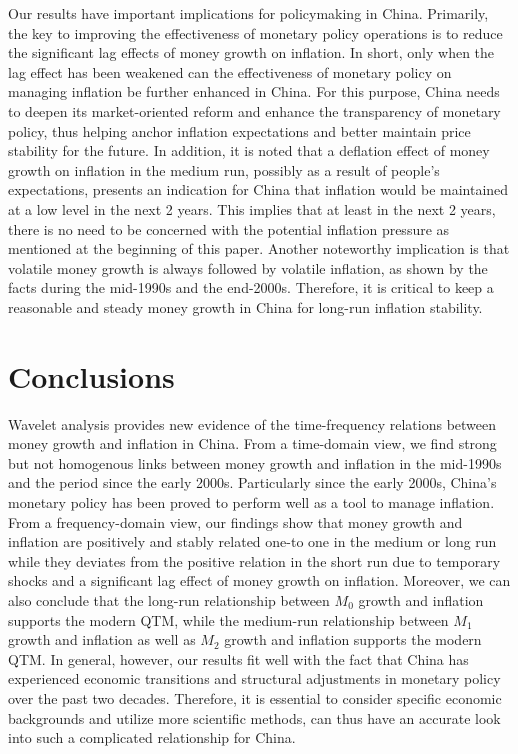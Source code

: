 \documentclass[a4paper,fleqn]{cas-sc}
\begin{document}
Our results have important implications for policymaking in China. Primarily, the key to improving the effectiveness of monetary policy operations is to reduce the significant lag effects of money growth on inflation. In short, only when the lag effect has been weakened can the effectiveness of monetary policy on managing inflation be further enhanced in China. For this purpose, China needs to deepen its market-oriented reform and enhance the transparency of monetary policy, thus helping anchor inflation expectations and better maintain price stability for the future. In addition, it is noted that a deflation effect of money growth on inflation in the medium run, possibly as a result of people's expectations, presents an indication for China that inflation would be maintained at a low level in the next 2 years. This implies that at least in the next 2 years, there is no need to be concerned with the potential inflation pressure as mentioned at the beginning of this paper. Another noteworthy implication is that volatile money growth is always followed by volatile inflation, as shown by the facts during the mid-1990s and the end-2000s. Therefore, it is critical to keep a reasonable and steady money growth in China for long-run inflation stability.

\section{Conclusions}\label{sec:6} 
Wavelet analysis provides new evidence of the time-frequency relations between money growth and inflation in China. From a time-domain view, we find strong but not homogenous links between money growth and inflation in the mid-1990s and the period since the early 2000s. Particularly since the early 2000s, China's monetary policy has been proved to perform well as a tool to manage inflation. From a frequency-domain view, our findings show that money growth and inflation are positively and stably related one-to one in the medium or long run while they deviates from the positive relation in the short run due to temporary shocks and a significant lag effect of money growth on inflation. Moreover, we can also conclude that the long-run relationship between $M_0$ growth and inflation supports the modern QTM, while the medium-run relationship between $M_1$ growth and inflation as well as $M_2$ growth and inflation supports the modern QTM. In general, however, our results fit well with the fact that China has experienced economic transitions and structural adjustments in monetary policy over the past two decades. Therefore, it is essential to consider specific economic backgrounds and utilize more scientific methods, can thus have an accurate look into such a complicated relationship for China.


\printcredits

%




\bio{}
\end{document}
